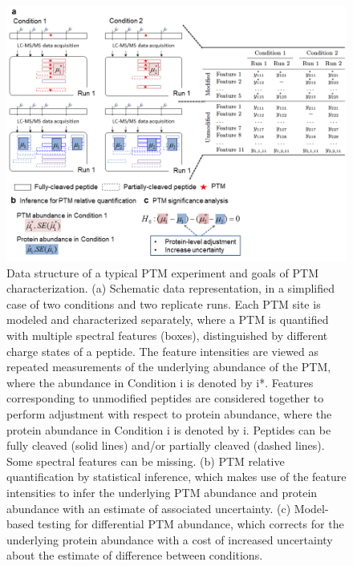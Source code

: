 \documentclass[mcp]{article}
\numberwithin{table}{section}
\begin{document}
\begin{figure}[ht]
\centering
\includegraphics[scale=.6]{images/fig3.png}
\caption{
Data structure of a typical PTM experiment and goals of PTM characterization. (a) Schematic data representation, in a simplified case of two conditions and two replicate runs. Each PTM site is modeled and characterized separately, where a PTM is quantified with multiple spectral features (boxes), distinguished by different charge states of a peptide. The feature intensities are viewed as repeated measurements of the underlying abundance of the PTM, where the abundance in Condition i is denoted by i*. Features corresponding to unmodified peptides are considered together to perform adjustment with respect to protein abundance, where the protein abundance in Condition i is denoted by i. Peptides can be fully cleaved (solid lines) and/or partially cleaved (dashed lines). Some spectral features can be missing. (b) PTM relative quantification by statistical inference, which makes use of the feature intensities to infer the underlying PTM abundance and protein abundance with an estimate of associated uncertainty. (c) Model-based testing for differential PTM abundance, which corrects for the underlying protein abundance with a cost of increased uncertainty about the estimate of difference between conditions.}
\label{fig:data-structure}
\end{figure}
\end{document}
